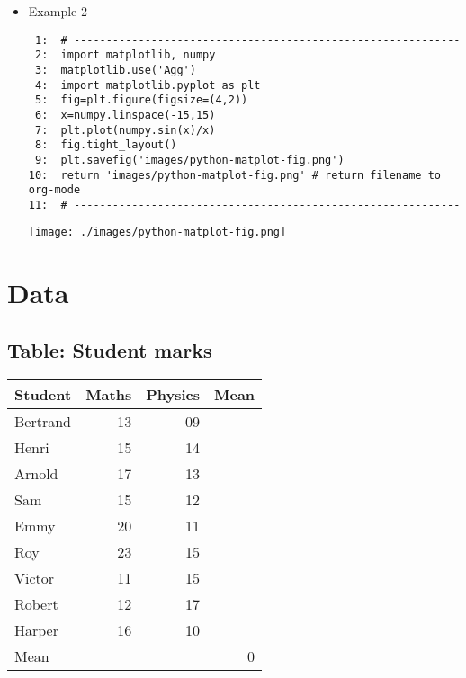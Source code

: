\documentclass[11pt]{article}
\begin{document}
\begin{itemize}
\item Example-2


\begin{verbatim}
 1:  # ------------------------------------------------------------
 2:  import matplotlib, numpy
 3:  matplotlib.use('Agg')
 4:  import matplotlib.pyplot as plt
 5:  fig=plt.figure(figsize=(4,2))
 6:  x=numpy.linspace(-15,15)
 7:  plt.plot(numpy.sin(x)/x)
 8:  fig.tight_layout()
 9:  plt.savefig('images/python-matplot-fig.png')
10:  return 'images/python-matplot-fig.png' # return filename to org-mode
11:  # ------------------------------------------------------------
\end{verbatim}

     \texttt{[image: ./images/python-matplot-fig.png]}
\end{itemize}
\section{Data}
\label{sec-2}
\subsection{Table: Student marks}
\label{sec-2-1}



\begin{center}
\begin{tabular}{lrrr}
 Student   &  Maths  &  Physics  &  Mean  \\
\hline
 Bertrand  &     13  &       09  &        \\
 Henri     &     15  &       14  &        \\
 Arnold    &     17  &       13  &        \\
 Sam       &     15  &       12  &        \\
 Emmy      &     20  &       11  &        \\
 Roy       &     23  &       15  &        \\
 Victor    &     11  &       15  &        \\
 Robert    &     12  &       17  &        \\
 Harper    &     16  &       10  &        \\
\hline
 Mean      &         &           &     0  \\
\end{tabular}
\end{center}
\end{document}
